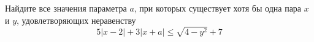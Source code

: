 \begin{ex}
	\begin{condition}
		Найдите все значения параметра \( a \), при которых существует хотя бы одна пара \( x \) и \( y \), удовлетворяющих неравенству \[ 5|x-2|+3|x+a|\le\sqrt{4-y^2}+7 \]
	\end{condition}
	\answer{\( [-5;1] \)}
\end{ex}